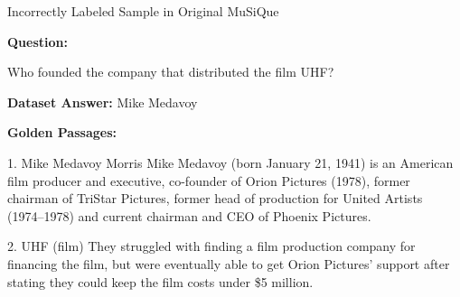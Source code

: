 \begin{frame}{Incorrectly Labeled Sample in Original MuSiQue}

\small

\textbf{Question:}

Who founded the company that distributed the film UHF?

\vspace{0.15cm}

\textbf{Dataset Answer:} Mike Medavoy

\vspace{0.15cm}

\textbf{Golden Passages:}

\begin{block}{1. Mike Medavoy}
    Morris Mike Medavoy (born January 21, 1941) is an American
    film producer and executive, co-founder of Orion Pictures (1978),
    former chairman of TriStar Pictures, former head of production
    for United Artists (1974--1978) and current chairman and CEO
    of Phoenix Pictures.
\end{block}

\begin{block}{2. UHF (film)}
    They struggled with finding a film production company for
    financing the film, but were eventually able to get
    Orion Pictures' support after stating they could keep the
    film costs under \$5 million.
\end{block}

\end{frame}
